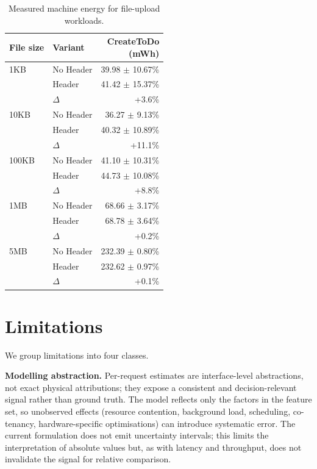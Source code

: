 \documentclass[sigconf]{acmart}
\begin{document}
\begin{table}[h]
\small
\centering
\caption{Measured machine energy for file-upload workloads.}
\label{tab:compare-file-loads}
\begin{tabular}{llr}
\toprule
File size & Variant & \makecell[r]{CreateToDo\\(mWh)} \\
\midrule
1KB & No Header & 39.98 $\pm$ 10.67\% \\
 & Header & 41.42 $\pm$ 15.37\% \\
 & $\Delta$ & +3.6\% \\
\midrule
10KB & No Header & 36.27 $\pm$ 9.13\% \\
 & Header & 40.32 $\pm$ 10.89\% \\
 & $\Delta$ & +11.1\% \\
\midrule
100KB & No Header & 41.10 $\pm$ 10.31\% \\
 & Header & 44.73 $\pm$ 10.08\% \\
 & $\Delta$ & +8.8\% \\
\midrule
1MB & No Header & 68.66 $\pm$ 3.17\% \\
 & Header & 68.78 $\pm$ 3.64\% \\
 & $\Delta$ & +0.2\% \\
\midrule
5MB & No Header & 232.39 $\pm$ 0.80\% \\
 & Header & 232.62 $\pm$ 0.97\% \\
 & $\Delta$ & +0.1\% \\
\bottomrule
\end{tabular}
\end{table}


\section{Limitations}
\label{sec:limitations}

We group limitations into four classes.

\textbf{Modelling abstraction.}
Per-request estimates are interface-level abstractions, not exact physical attributions; they expose a consistent and decision-relevant signal rather than ground truth. The model reflects only the factors in the feature set, so unobserved effects (resource contention, background load, scheduling, co-tenancy, hardware-specific optimisations) can introduce systematic error. The current formulation does not emit uncertainty intervals; this limits the interpretation of absolute values but, as with latency and throughput, does not invalidate the signal for relative comparison.
\end{document}

